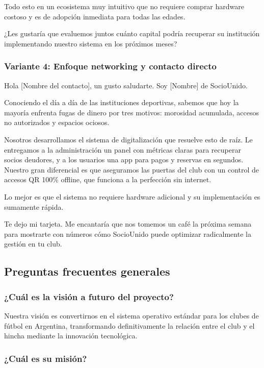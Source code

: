 Todo esto en un ecosistema muy intuitivo que no requiere comprar hardware costoso y es de adopción inmediata para todas las edades.

¿Les gustaría que evaluemos juntos cuánto capital podría recuperar su institución implementando nuestro sistema en los próximos meses?

\subsubsection{Variante 4: Enfoque networking y contacto directo}

Hola [Nombre del contacto], un gusto saludarte. Soy [Nombre] de SocioUnido.

Conociendo el día a día de las instituciones deportivas, sabemos que hoy la mayoría enfrenta fugas de dinero por tres motivos: morosidad acumulada, accesos no autorizados y espacios ociosos. 

Nosotros desarrollamos el sistema de digitalización que resuelve esto de raíz. Le entregamos a la administración un panel con métricas claras para recuperar socios deudores, y a los usuarios una app para pagos y reservas en segundos. Nuestro gran diferencial es que aseguramos las puertas del club con un control de accesos QR 100\% offline, que funciona a la perfección sin internet.

Lo mejor es que el sistema no requiere hardware adicional y su implementación es sumamente rápida.

Te dejo mi tarjeta. Me encantaría que nos tomemos un café la próxima semana para mostrarte con números cómo SocioUnido puede optimizar radicalmente la gestión en tu club.

\newpage

\subsection{Preguntas frecuentes generales}

\subsubsection{¿Cuál es la visión a futuro del proyecto?}

Nuestra visión es convertirnos en el sistema operativo estándar para los clubes de fútbol en Argentina, transformando definitivamente la relación entre el club y el hincha mediante la innovación tecnológica.

\subsubsection{¿Cuál es su misión?}

